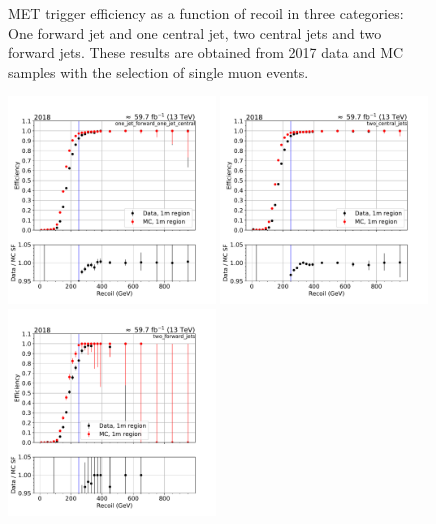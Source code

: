 \begin{figure}[htp]
\begin{center}
    \end{center}
    \caption{MET trigger efficiency as a function of recoil in three categories: One forward jet and one central jet, two central jets and
            two forward jets. These results are obtained from 2017 data and MC samples with the selection of single muon events.} 
    \label{fig:eff_recoil_2017_1m}
\end{figure}

\begin{figure}[hbp]
    \begin{center}
        \includegraphics[width=0.49\textwidth]{fig/efficiency/trigger/met/recoil/data_mc_comparison_1m_2018_one_jet_forward_one_jet_central.pdf}
        \includegraphics[width=0.49\textwidth]{fig/efficiency/trigger/met/recoil/data_mc_comparison_1m_2018_two_central_jets.pdf} \\
        \includegraphics[width=0.49\textwidth]{fig/efficiency/trigger/met/recoil/data_mc_comparison_1m_2018_two_forward_jets.pdf}

\end{center}
\end{figure}
